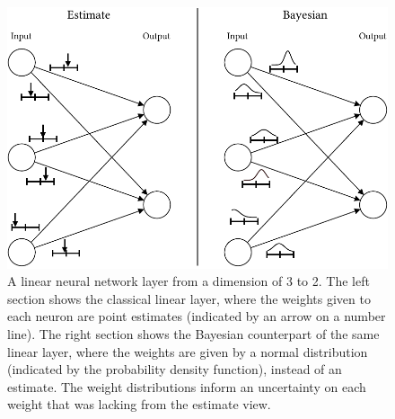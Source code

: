 \begin{figure}[ht]
    \centering
    \includegraphics[width = \linewidth]{report/figures/bayesian.pdf}
    \caption{A linear neural network layer from a dimension of 3 to 2. The left section shows the classical linear layer, where the weights given to each neuron are point estimates (indicated by an arrow on a number line). The right section shows the Bayesian counterpart of the same linear layer, where the weights are given by a normal distribution (indicated by the probability density function), instead of an estimate. The weight distributions inform an uncertainty on each weight that was lacking from the estimate view.}
    \label{fig:bayesian_network}
\end{figure}


